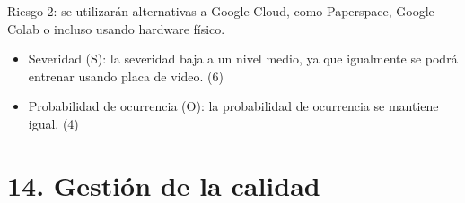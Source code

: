 \documentclass[
11pt, %
]{charter}
\begin{document}
Riesgo 2: se utilizarán alternativas a Google Cloud, como Paperspace, Google Colab o incluso usando hardware físico.
\begin{itemize}
	\item Severidad (S): la severidad baja a un nivel medio, ya que igualmente se podrá entrenar usando placa de video. (6)
  	\item Probabilidad de ocurrencia (O): la probabilidad de ocurrencia se mantiene igual. (4)
\end{itemize}
 



\section{14. Gestión de la calidad}
\label{sec:calidad}
\end{document}
